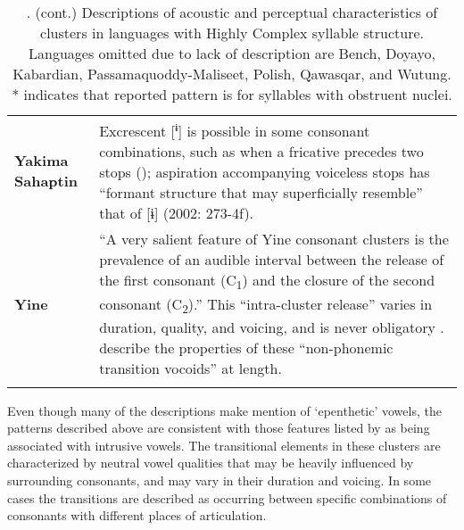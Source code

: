 \begin{table}
\begin{tabularx}{\textwidth}{XX}
\textbf{Yakima} \textbf{Sahaptin} & Excrescent [\textsuperscript{ɨ}] is possible in some consonant combinations, such as when a fricative precedes two stops (\citealt{HargusBeavert2002}); aspiration accompanying voiceless stops has “formant structure that may superficially resemble” that of [ɨ] (2002: 273-4f).\\
\textbf{Yine} & “A very salient feature of Yine consonant clusters is the prevalence of an audible interval between the release of the first consonant (C\textsubscript{1}) and the closure of the second consonant (C\textsubscript{2}).” This “intra-cluster release” varies in duration, quality, and voicing, and is never obligatory \citep[28-9]{Hanson2010}. \citet{MattesonPike1958} describe the properties of these “non-phonemic transition vocoids” at length.\\
\lspbottomrule
\end{tabularx}
\caption{\label{tab:key:3.17}. (cont.) Descriptions of acoustic and perceptual characteristics of clusters in languages with Highly Complex syllable structure. Languages omitted due to lack of description are Bench, Doyayo, Kabardian, Passamaquoddy-Maliseet, Polish, Qawasqar, and Wutung. * indicates that reported pattern is for syllables with obstruent nuclei.}
\end{table}

  Even though many of the descriptions make mention of ‘epenthetic’ vowels, the patterns described above are consistent with those features listed by \citet{Hall2006} as being associated with intrusive vowels. The transitional elements in these clusters are characterized by neutral vowel qualities that may be heavily influenced by surrounding consonants, and may vary in their duration and voicing. In some cases the transitions are described as occurring between specific combinations of consonants with different places of articulation.

